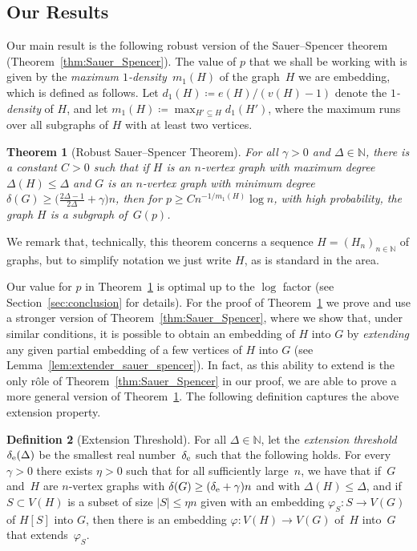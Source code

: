 \documentclass[final]{article}
\newtheorem{theorem}{Theorem}[section]
\theoremstyle{definition}
\newtheorem{definition}[theorem]{Definition}
\newcommand{\exth}{\delta_{\rm e}(\Delta)}
\begin{document}
\subsection{Our Results}

Our main result is the following robust version of the
Sauer--Spencer theorem (Theo\-rem~\ref{thm:Sauer_Spencer}). The value
of $p$ that we shall be working with is given by the \emph{maximum
  $1$-density}~$m_1(H)$ of the graph~$H$ we are embedding, which is
defined as follows. Let $d_1(H)\coloneqq e(H)/(v(H) -1)$ denote the
\emph{$1$-density} of $H$, and let
$m_1(H)\coloneqq \max_{H'\subseteq H}d_1(H')$, where the maximum runs over all
subgraphs of $H$ with at least two vertices.

\begin{theorem}[Robust Sauer--Spencer Theorem]
    \label{thm:Robust_main_basic}
    For all\/ $\gamma > 0$ and\/ $\Delta \in \mathbb{N}$, there is a
    constant\/ $C > 0$ such that if\/ $H$ is an\/ $n$-vertex graph
    with maximum degree\/ $\Delta(H) \leq \Delta$ and\/ $G$ is an\/
    $n$-vertex graph with minimum degree\/
    $\delta(G) \geq \bigl( \tfrac{2\Delta-1}{2\Delta}+ \gamma\bigr) n$,
    then for\/ $p \geq C n^{-1/m_1(H)}\log n$, with high probability, the graph\/ $H$ is
    a subgraph of~$G(p)$.
\end{theorem}

We remark that, technically, this theorem concerns a sequence $H=(H_n)_{n\in\mathbb{N}}$ of graphs, but to simplify notation
we just write $H$, as is standard in the area.

Our value for $p$ in Theorem~\ref{thm:Robust_main_basic} is optimal up
to the $\log$ factor (see Section~\ref{sec:conclusion} for details). For the proof of
Theorem~\ref{thm:Robust_main_basic} we prove and use a stronger
version of Theorem~\ref{thm:Sauer_Spencer}, where we show that, under similar conditions, it is
possible to obtain an embedding of $H$ into $G$ by \emph{extending} any
given partial embedding of a few vertices of $H$ into $G$ (see Lemma~\ref{lem:extender_sauer_spencer}). In fact, as
this ability to extend is the only r\^{o}le of Theorem~\ref{thm:Sauer_Spencer} in our proof,
we are able to prove a more general version of
Theorem~\ref{thm:Robust_main_basic}. The
following definition captures the above extension property.

\begin{definition}[Extension Threshold]
\label{defn:extension_threshold}
For all $\Delta \in \mathbb{N}$, let the \emph{extension threshold}
$\exth$ be the smallest real number~$\delta_{\rm e}$ such that the
following holds.
For every $\gamma>0$ there exists $\eta>0$ such that for all
sufficiently large~$n$, we have that if~$G$ and~$H$ are $n$-vertex graphs with
$\delta(G)\ge(\delta_{\rm e}+\gamma)n$ and with $\Delta(H)\le\Delta$, and if
$S\subset V(H)$ is a subset of size $|S|\le\eta n$ given with an embedding $\varphi_S: S\to V(G)$ of $H[S]$ into $G$, then there
is an embedding $\varphi: V(H)\to V(G)$ of~$H$ into~$G$ that
extends~$\varphi_S$. 
\end{definition}
\end{document}
